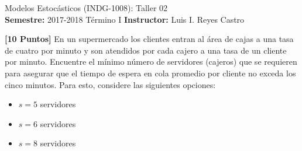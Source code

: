 \documentclass[ a4paper, twoside, 11pt]{article}
\newcommand{\numero}{02}
\begin{document}
\allowdisplaybreaks

\begin{center}
\Large Modelos Estoc\'asticos (INDG-1008): Taller \numero \\[1ex]
\small \textbf{Semestre:} 2017-2018 T\'ermino I \qquad
\textbf{Instructor:} Luis I. Reyes Castro
\end{center}
\halfskip



\begin{problem}
\textbf{[10 Puntos]} En un supermercado los clientes entran al \'area de cajas a una tasa de cuatro por minuto y son atendidos por cada cajero a una tasa de un cliente por minuto. Encuentre el m\'inimo n\'umero de servidores (\ie cajeros) que se requieren para asegurar que el tiempo de espera en cola promedio por cliente no exceda los cinco minutos. Para esto, considere las siguientes opciones: 
\begin{itemize}
\item $s = 5$ servidores
\item $s = 6$ servidores
\item $s = 8$ servidores
\end{itemize}

\end{problem}
\vspace{\baselineskip}
\end{document}
